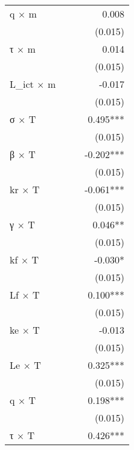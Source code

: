 \begin{tabular}{lrrr}
q $\times$ m           &            &            &      0.008 \\ 
                       &            &            &    (0.015) \\ 
τ $\times$ m           &            &            &      0.014 \\ 
                       &            &            &    (0.015) \\ 
L\_ict $\times$ m      &            &            &     -0.017 \\ 
                       &            &            &    (0.015) \\ 
σ $\times$ T           &            &            &   0.495*** \\ 
                       &            &            &    (0.015) \\ 
β $\times$ T           &            &            &  -0.202*** \\ 
                       &            &            &    (0.015) \\ 
kr $\times$ T          &            &            &  -0.061*** \\ 
                       &            &            &    (0.015) \\ 
γ $\times$ T           &            &            &    0.046** \\ 
                       &            &            &    (0.015) \\ 
kf $\times$ T          &            &            &    -0.030* \\ 
                       &            &            &    (0.015) \\ 
Lf $\times$ T          &            &            &   0.100*** \\ 
                       &            &            &    (0.015) \\ 
ke $\times$ T          &            &            &     -0.013 \\ 
                       &            &            &    (0.015) \\ 
Le $\times$ T          &            &            &   0.325*** \\ 
                       &            &            &    (0.015) \\ 
q $\times$ T           &            &            &   0.198*** \\ 
                       &            &            &    (0.015) \\ 
τ $\times$ T           &            &            &   0.426*** \\ 

\end{tabular}
